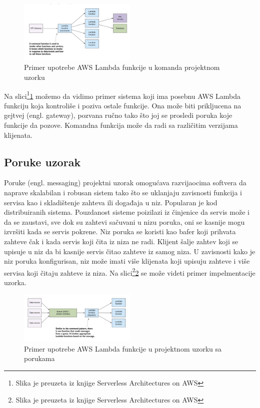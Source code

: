 \documentclass[12pt,oneside]{memoir}
\begin{document}
\begin{figure}[!ht]
  \centering
  \includegraphics[width=0.5\textwidth]{Slika 12.png}
  \caption{Primer upotrebe AWS Lambda funkcije u komanda projektnom uzorku}
  \label{fig:komanda}
\end{figure}
 
Na slici\footnote{Slika je preuzeta iz knjige Serverless Architectures on AWS}\ref{fig:komanda} možemo da vidimo primer sistema koji ima posebnu AWS Lambda funkciju koja kontroliše i poziva ostale funkcije. Ona može biti prikljucena na gejtvej (engl. gateway), pozvana ručno tako što joj se prosledi poruka koje funkcije da pozove. Komandna funkcija može da radi sa različitim verzijama klijenata.

\subsection{Poruke uzorak} %

Poruke (engl. messaging) projektni uzorak omogućava razvijaocima softvera da naprave skalabilan i robusan sistem tako što se uklanjaju zavisnosti funkcija i servisa kao i skladištenje zahteva ili događaja u niz. Popularan je kod distribuiranih sistema\cite{sa}. Pouzdanost sisteme poizilazi iz činjenice da servis može i da se zaustavi, sve dok su zahtevi sačuvani u nizu poruka, oni se kasnije mogu izvršiti kada se servis pokrene. Niz poruka se koristi kao bafer koji prihvata zahteve čak i kada servis koji čita iz niza ne radi. Klijent šalje zahtev koji se upisuje u niz da bi kasnije servis čitao zahteve iz samog niza. U zavisnosti kako je niz poruka konfigurisan, niz može imati više klijenata koji upisuju zahteve i više servisa koji čitaju zahteve iz niza. Na slici\footnote{Slika je preuzeta iz knjige Serverless Architectures on AWS}\ref{fig:poruke} se može videti primer impelmentacije uzorka.

\begin{figure}[!ht]
  \centering
  \includegraphics[width=0.5\textwidth]{Slika 13.png}
  \caption{Primer upotrebe AWS Lambda funkcije u projektnom uzorku sa porukama}
  \label{fig:poruke}
\end{figure}
 
\end{document}
